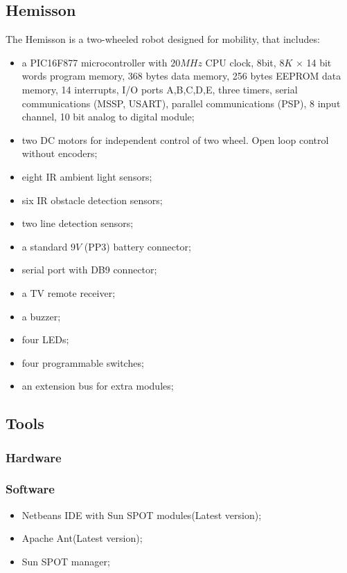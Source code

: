 \documentclass[a4paper,10pt]{article} %
\begin{document}
\subsection{Hemisson} %
\label{sub:Hemisson}

The Hemisson is a two-wheeled robot designed for mobility, that includes:
\begin{itemize}
    \item a PIC16F877 microcontroller with $20MHz$ CPU clock, 8bit,
    $8K$ $\times$ 14 bit words program memory, 368 bytes data memory, 256 bytes
    EEPROM data memory, 14 interrupts, I/O ports A,B,C,D,E, three timers,
    serial communications (MSSP, USART), parallel communications (PSP), 8
    input channel, 10 bit analog to digital module;
    \item two DC motors for independent control of two wheel. Open loop
    control without encoders;
    \item eight IR ambient light sensors;
    \item six IR obstacle detection sensors;
    \item two line detection sensors;
    \item a standard $9V$ (PP3) battery connector;
    \item serial port with DB9 connector;
    \item a TV remote receiver;
    \item a buzzer;
    \item four LEDs;
    \item four programmable switches;
    \item an extension bus for extra modules;
\end{itemize}


\subsection{Tools} %


\subsubsection{Hardware} %


\subsubsection{Software} %
\begin{itemize}
    \item Netbeans IDE with Sun SPOT modules(Latest version);
    \item Apache Ant(Latest version);
    \item Sun SPOT manager;
\end{itemize}





\end{document}
